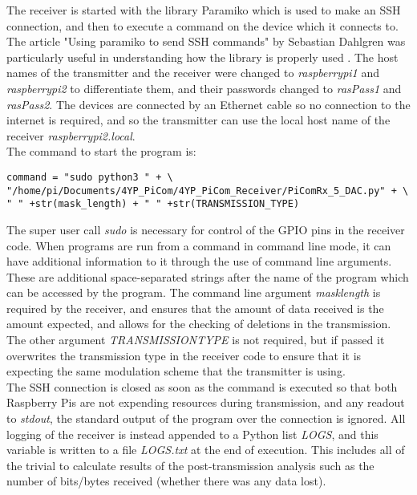 \documentclass[../main.tex]{subfiles}
\begin{document}
The receiver is started with the library Paramiko \cite{lib_Paramiko} which is used to make an SSH connection, and then to execute a command on the device which it connects to.
The article "Using paramiko to send SSH commands" by Sebastian Dahlgren was particularly useful in understanding how the library is properly used \cite{web_ParamikoSSH}.
The host names of the transmitter and the receiver were changed to \textit{raspberrypi1} and \textit{raspberrypi2} to differentiate them, and their passwords changed to \textit{rasPass1} and \textit{rasPass2}.
The devices are connected by an Ethernet cable so no connection to the internet is required, and so the transmitter can use the local host name of the receiver \textit{raspberrypi2.local}.\\

The command to start the program is:

\begin{lstlisting}[caption=Command Line to Start the Receiver]
command = "sudo python3 " + \
"/home/pi/Documents/4YP_PiCom/4YP_PiCom_Receiver/PiComRx_5_DAC.py" + \
" " +str(mask_length) + " " +str(TRANSMISSION_TYPE)
\end{lstlisting}

The super user call \textit{sudo} is necessary for control of the GPIO pins in the receiver code.
When programs are run from a command in command line mode, it can have additional information to it through the use of command line arguments.
These are additional space-separated strings after the name of the program which can be accessed by the program.
The command line argument \textit{mask\textunderscore length} is required by the receiver, and ensures that the amount of data received is the amount expected, and allows for the checking of deletions in the transmission.
The other argument \textit{TRANSMISSION\textunderscore TYPE} is not required, but if passed it overwrites the transmission type in the receiver code to ensure that it is expecting the same modulation scheme that the transmitter is using.\\

The SSH connection is closed as soon as the command is executed so that both Raspberry Pis are not expending resources during transmission, and any readout to \textit{stdout}, the standard output of the program over the connection is ignored.
All logging of the receiver is instead appended to a Python list \textit{LOGS}, and this variable is written to a file \textit{LOGS.txt} at the end of execution.
This includes all of the trivial to calculate results of the post-transmission analysis such as the number of bits/bytes received (whether there was any data lost).
\end{document}
